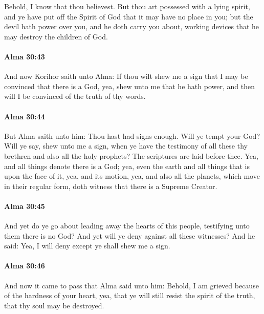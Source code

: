 			Behold, I know that thou believest.
			But thou art possessed with a lying spirit,
			and ye have put off the Spirit of God that it may have no place in you;
			but the devil hath power over you,
			and he doth carry you about,
			working devices that he may destroy the children of God.

		\paragraph{Alma 30:43} %
			\label{ALMA-30-43}

			And now Korihor saith unto Alma:
			If thou wilt shew me a sign that I may be convinced that there is a God,
			yea, shew unto me that he hath power,
			and then will I be convinced of the truth of thy words.

		\paragraph{Alma 30:44} %
			\label{ALMA-30-44}

			But Alma saith unto him:
			Thou hast had signs enough.
			Will ye tempt your God?
			Will ye say,
			shew unto me a sign,
			when ye have the testimony of all these thy brethren
			and also all the holy prophets?
			The scriptures are laid before thee.
			Yea, and all things denote there is a God;
			yea, even the earth and all things that is upon the face of it,
			yea, and its motion,
			yea, and also all the planets, which move in their regular form,
			doth witness that there is a Supreme Creator.

		\paragraph{Alma 30:45} %
			\label{ALMA-30-45}

			And yet do ye go about leading away the hearts of this people,
			testifying unto them there is no God?
			And yet will ye deny against all these witnesses?
			And he said:
			Yea, I will deny except ye shall shew me a sign.

		\paragraph{Alma 30:46} %
			\label{ALMA-30-46}

			And now it came to pass that Alma said unto him:
			Behold, I am grieved because of the hardness of your heart,
			yea, that ye will still resist the spirit of the truth,
			that thy soul may be destroyed.


